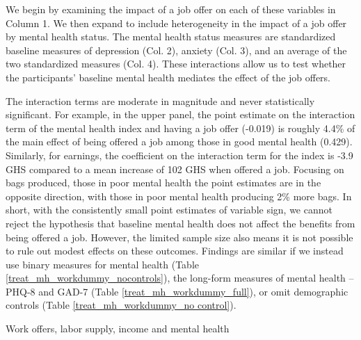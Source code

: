 \documentclass[12pt, a4paper, american]{article}
\begin{document}
We begin by examining the impact of a job offer on each of these variables in Column 1. We then expand to include heterogeneity in the impact of a job offer by mental health status. The mental health status measures are standardized baseline measures of depression (Col. 2), anxiety (Col. 3), and an average of the two standardized measures (Col. 4). These interactions allow us to test whether the participants' baseline mental health mediates the effect of the job offers. 

The interaction terms are moderate in magnitude and never statistically significant. For example, in the upper panel, the point estimate on the interaction term of the mental health index and having a job offer (-0.019) is roughly 4.4\% of the main effect of being offered a job among those in good mental health (0.429). Similarly, for earnings, the coefficient on the interaction term for the index is -3.9 GHS compared to a mean increase of 102 GHS when offered a job. Focusing on bags produced, those in poor mental health the point estimates are in the opposite direction, with those in poor mental health producing 2\% more bags. In short, with the consistently small point estimates of variable sign, we cannot reject the hypothesis that baseline mental health does not affect the benefits from being offered a job. However, the limited sample size also means it is not possible to rule out modest effects on these outcomes. Findings are similar if we instead use binary measures for mental health (Table \ref{treat_mh_workdummy_nocontrols}), the long-form measures of mental health -- PHQ-8 and GAD-7 (Table \ref{treat_mh_workdummy_full}), or omit demographic controls (Table \ref{treat_mh_workdummy_no control}).


\begin{table}\caption{Work offers, labor supply, income and mental health}\label{treat_mh_workdummy}
\centering
{}
\end{table}
\end{document}
